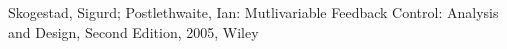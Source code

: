 \begin{thebibliography}{999}%
 Skogestad, Sigurd; Postlethwaite, Ian: \glqq Mutlivariable Feedback Control: Analysis and Design\grqq , Second Edition, 2005, Wiley



\end{thebibliography}